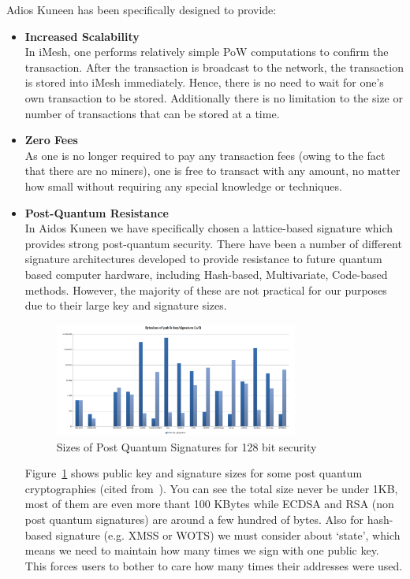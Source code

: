 \documentclass[a4paper,10pt,twocolumn]{article}
\begin{document}
	\vspace{2.5mm}
	
	Adios Kuneen has been specifically designed to provide:
	\vspace{-0.5\baselineskip}
	\begin{itemize}
		\setlength\itemsep{0em}
		\item\textbf{Increased Scalability}\mbox{}\\ 
	In iMesh, one performs relatively simple PoW computations to confirm the transaction. After the transaction is broadcast to the network,
	the transaction is stored into iMesh immediately. Hence, there is no need to wait for one's own transaction to be stored. Additionally 
	there is no limitation to the size or number of transactions that can be stored at a time. 
	\item\textbf{Zero Fees}\mbox{}\\ 
	As one is no longer required to pay any transaction fees (owing to the fact that there are no miners), one is free to 
	transact with any amount, no matter how small without requiring any special knowledge or techniques.
	
	\item\textbf{Post-Quantum Resistance}\mbox{}\\ 
	In Aidos Kuneen we have specifically chosen a lattice-based signature which provides strong post-quantum security. There have been a 
	number of different signature architectures developed to provide resistance to future quantum based computer hardware, including 
	Hash-based, Multivariate, Code-based methods. However, the majority of these are not practical for our purposes due to their large key and 
	signature sizes.   
	
	
	\begin{figure}[ht]
		\begin{center}
		\includegraphics[width=80mm]{sizes.png}
		  \caption{Sizes of Post Quantum Signatures for 128 bit security}
		\label{fig:sizes}
		\end{center}
	 \end{figure}

	 Figure~\ref{fig:sizes} shows  public key and signature sizes for some post quantum cryptographies (cited from~\cite{falcon}).
	 You can see the total size never be under 1KB, most of them are even more thant 100 KBytes while ECDSA and RSA (non post quantum signatures) are around a few hundred of bytes.
	 Also for hash-based signature (e.g. XMSS or WOTS) we must consider about `state', which means we need to maintain how many times we sign with one public key.
	 This forces users to bother to care how many times their addresses were used.


\end{itemize}
\end{document}
